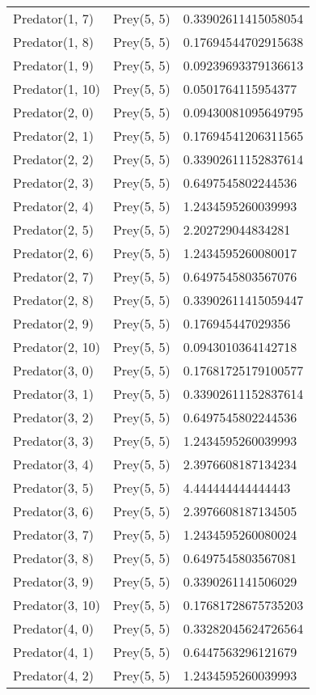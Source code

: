 \begin{longtable}{| p{} | p{} | p{} |}
Predator(1, 7) & Prey(5, 5) &0.33902611415058054\\
Predator(1, 8) & Prey(5, 5) &0.17694544702915638\\
Predator(1, 9) & Prey(5, 5) &0.09239693379136613\\
Predator(1, 10) & Prey(5, 5) &0.0501764115954377\\
Predator(2, 0) & Prey(5, 5) &0.09430081095649795\\
Predator(2, 1) & Prey(5, 5) &0.17694541206311565\\
Predator(2, 2) & Prey(5, 5) &0.33902611152837614\\
Predator(2, 3) & Prey(5, 5) &0.6497545802244536\\
Predator(2, 4) & Prey(5, 5) &1.2434595260039993\\
Predator(2, 5) & Prey(5, 5) &2.202729044834281\\
Predator(2, 6) & Prey(5, 5) &1.2434595260080017\\
Predator(2, 7) & Prey(5, 5) &0.6497545803567076\\
Predator(2, 8) & Prey(5, 5) &0.33902611415059447\\
Predator(2, 9) & Prey(5, 5) &0.176945447029356\\
Predator(2, 10) & Prey(5, 5) &0.0943010364142718\\
Predator(3, 0) & Prey(5, 5) &0.17681725179100577\\
Predator(3, 1) & Prey(5, 5) &0.33902611152837614\\
Predator(3, 2) & Prey(5, 5) &0.6497545802244536\\
Predator(3, 3) & Prey(5, 5) &1.2434595260039993\\
Predator(3, 4) & Prey(5, 5) &2.3976608187134234\\
Predator(3, 5) & Prey(5, 5) &4.444444444444443\\
Predator(3, 6) & Prey(5, 5) &2.3976608187134505\\
Predator(3, 7) & Prey(5, 5) &1.2434595260080024\\
Predator(3, 8) & Prey(5, 5) &0.6497545803567081\\
Predator(3, 9) & Prey(5, 5) &0.3390261141506029\\
Predator(3, 10) & Prey(5, 5) &0.17681728675735203\\
Predator(4, 0) & Prey(5, 5) &0.33282045624726564\\
Predator(4, 1) & Prey(5, 5) &0.6447563296121679\\
Predator(4, 2) & Prey(5, 5) &1.2434595260039993\\

\end{longtable}
